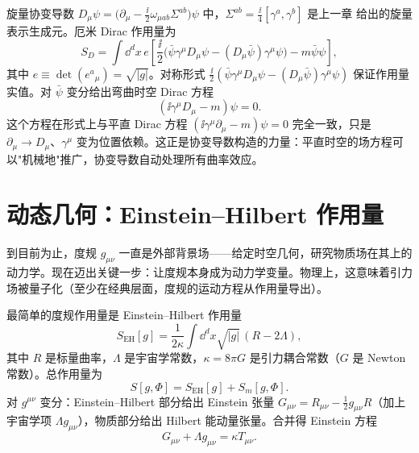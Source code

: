 旋量协变导数 $D_\mu\psi=\big(\partial_\mu-\frac{\ii}{2}\omega_{\mu ab}\Sigma^{ab}\big)\psi$ 中，$\Sigma^{ab}=\frac{\ii}{4}[\gamma^a,\gamma^b]$ 是上一章 给出的旋量表示生成元。厄米 Dirac 作用量为
\begin{equation*}{
S_D=\int \dd^dx\,e\left[\frac{\ii}{2}\big(\bar\psi\gamma^\mu D_\mu\psi-(D_\mu\bar\psi)\gamma^\mu\psi\big)-m\bar\psi\psi\right],
}
\end{equation*}
其中 $e\equiv\det(e^a{}_\mu)=\sqrt{|g|}$。对称形式 $\frac{\ii}{2}(\bar\psi\gamma^\mu D_\mu\psi-(D_\mu\bar\psi)\gamma^\mu\psi)$ 保证作用量实值。对 $\bar\psi$ 变分给出弯曲时空 Dirac 方程
\begin{equation}
(\ii\gamma^\mu D_\mu-m)\psi=0.
\end{equation}
这个方程在形式上与平直 Dirac 方程 $(\ii\gamma^\mu\partial_\mu-m)\psi=0$ 完全一致，只是 $\partial_\mu\to D_\mu$、$\gamma^\mu$ 变为位置依赖。这正是协变导数构造的力量：平直时空的场方程可以"机械地"推广，协变导数自动处理所有曲率效应。

\section{动态几何：Einstein--Hilbert 作用量}

到目前为止，度规 $g_{\mu\nu}$ 一直是外部背景场——给定时空几何，研究物质场在其上的动力学。现在迈出关键一步：让度规本身成为动力学变量。物理上，这意味着引力场被量子化（至少在经典层面，度规的运动方程从作用量导出）。

最简单的度规作用量是 Einstein--Hilbert 作用量
\begin{equation*}S_{\text{EH}}[g]=\frac{1}{2\kappa}\int \dd^dx\sqrt{|g|}\,(R-2\Lambda),
\end{equation*}
其中 $R$ 是标量曲率，$\Lambda$ 是宇宙学常数，$\kappa=8\pi G$ 是引力耦合常数（$G$ 是 Newton 常数）。总作用量为
\begin{equation}
S[g,\Phi]=S_{\text{EH}}[g]+S_m[g,\Phi].
\end{equation}
对 $g^{\mu\nu}$ 变分：Einstein--Hilbert 部分给出 Einstein 张量 $G_{\mu\nu}=R_{\mu\nu}-\frac{1}{2}g_{\mu\nu}R$（加上宇宙学项 $\Lambda g_{\mu\nu}$），物质部分给出 Hilbert 能动量张量。合并得 Einstein 方程
\begin{equation}\label{eq:ms-curved-einstein}
{G_{\mu\nu}+\Lambda g_{\mu\nu}=\kappa T_{\mu\nu}.}
\end{equation}

